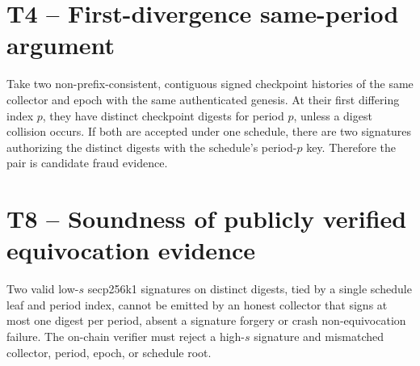 \section*{T4 -- First-divergence same-period argument}
Take two non-prefix-consistent, contiguous signed checkpoint histories of
the same collector and epoch with the same authenticated genesis. At their
first differing index $p$, they have distinct checkpoint digests for period
$p$, unless a digest collision occurs. If both are accepted under one
schedule, there are two signatures authorizing the distinct digests with the
schedule's period-$p$ key. Therefore the pair is candidate fraud evidence.

\section*{T8 -- Soundness of publicly verified equivocation evidence}
Two valid low-$s$ secp256k1 signatures on distinct digests, tied by a single
schedule leaf and period index, cannot be emitted by an honest collector that
signs at most one digest per period, absent a signature forgery or crash
non-equivocation failure. The on-chain verifier must reject a high-$s$
signature and mismatched collector, period, epoch, or schedule root.
